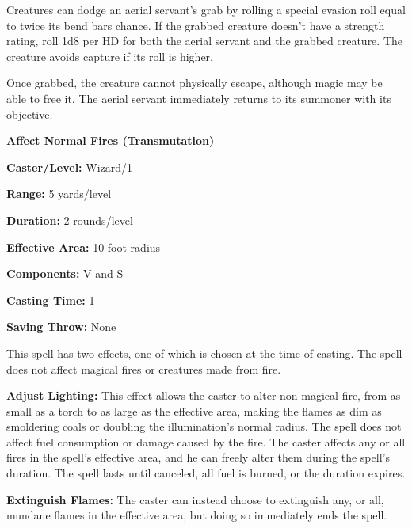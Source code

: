 \begin{multicols}{2}
Creatures can dodge an aerial servant's grab by rolling a special evasion roll equal to twice its bend bars chance.  If the grabbed creature doesn't have a strength rating, roll 1d8 per HD for both the aerial servant and the grabbed creature.  The creature avoids capture if its roll is higher.

Once grabbed, the creature cannot physically escape, although magic may be able to free it.  The aerial servant immediately returns to its summoner with its objective.  

\vspace{1em}

\noindent
\begin{minipage}{\columnwidth}

\noindent \textbf{Affect Normal Fires (Transmutation)}

\noindent \textbf{Caster/Level:} Wizard/1

\noindent \textbf{Range:} 5 yards/level

\noindent \textbf{Duration:} 2 rounds/level

\noindent \textbf{Effective Area:} 10-foot radius

\noindent \textbf{Components:} V and S

\noindent \textbf{Casting Time:} 1

\noindent \textbf{Saving Throw:} None

\end{minipage}

This spell has two effects, one of which is chosen at the time of casting.  The spell does not affect magical fires or creatures made from fire.

\textbf{Adjust Lighting:} This effect allows the caster to alter non-magical fire, from as small as a torch to as large as the effective area, making the flames as dim as smoldering coals or doubling the illumination's normal radius.  The spell does not affect fuel consumption or damage caused by the fire.  The caster affects any or all fires in the spell's effective area, and he can freely alter them during the spell's duration.  The spell lasts until canceled, all fuel is burned, or the duration expires.  

\textbf{Extinguish Flames:} The caster can instead choose to extinguish any, or all, mundane flames in the effective area, but doing so immediately ends the spell.

\vspace{1em}
 
\noindent
\begin{minipage}{\columnwidth}


\end{minipage}
\end{multicols}
